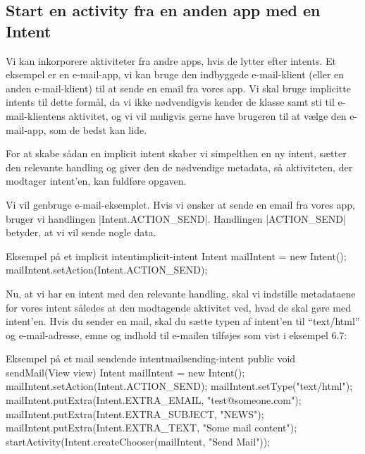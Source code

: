 \subsection{Start en activity fra en anden app med en Intent}

Vi kan inkorporere aktiviteter fra andre apps, hvis de lytter efter intents. Et eksempel er en e-mail-app, vi kan bruge den indbyggede e-mail-klient (eller en anden e-mail-klient) til at sende en email fra vores app. Vi skal bruge implicitte intents til dette formål, da vi ikke nødvendigvis kender de klasse samt sti til e-mail-klientens aktivitet, og vi vil muligvis gerne have brugeren til at vælge den e-mail-app, som de bedst kan lide.

For at skabe sådan en implicit intent skaber vi simpelthen en ny intent, sætter den relevante handling og giver den de nødvendige metadata, så aktiviteten, der modtager intent'en, kan fuldføre opgaven.

Vi vil genbruge e-mail-eksemplet. Hvis vi ønsker at sende en email fra vores app, bruger vi handlingen \JavaInline|Intent.ACTION_SEND|. Handlingen \JavaInline|ACTION_SEND| betyder, at vi vil sende nogle data.

\begin{example}\noindent
	\begin{JavaCode}{Eksempel på et implicit intent}{implicit-intent}
		Intent mailIntent = new Intent();
		mailIntent.setAction(Intent.ACTION_SEND);
	\end{JavaCode}
\end{example}

Nu, at vi har en intent med den relevante handling, skal vi indstille metadataene for vores intent således at den modtagende aktivitet ved, hvad de skal gøre med intent'en. Hvis du sender en mail, skal du sætte typen af intent'en til ``text/html'' og e-mail-adresse, emne og indhold til e-mailen tilføjes som vist i eksempel 6.7:

\begin{example}\noindent
	\begin{JavaCode}{Eksempel på et mail sendende intent}{mailsending-intent}
		public void sendMail(View view) {
			Intent mailIntent = new Intent();
			mailIntent.setAction(Intent.ACTION_SEND);
			mailIntent.setType("text/html");
			mailIntent.putExtra(Intent.EXTRA_EMAIL, "test@someone.com");
			mailIntent.putExtra(Intent.EXTRA_SUBJECT, "NEWS");
			mailIntent.putExtra(Intent.EXTRA_TEXT, "Some mail content");
			startActivity(Intent.createChooser(mailIntent, "Send Mail"));
		}
	\end{JavaCode}
\end{example}

